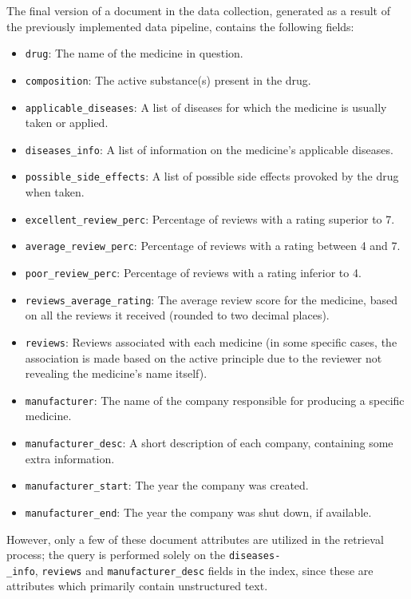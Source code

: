 \documentclass[sigconf]{acmart}
\begin{document}
The final version of a document in the data collection, generated as a result of the previously implemented data pipeline, contains the following fields:
\begin{itemize}
	\item {\texttt{drug}}: The name of the medicine in question.
	\item {\texttt{composition}}: The active substance(s) present in the drug.
	\item {\texttt{applicable\_diseases}}: A list of diseases for which the medicine is usually taken or applied.
	\item {\texttt{diseases\_info}}: A list of information on the medicine's applicable diseases.
	\item {\texttt{possible\_side\_effects}}: A list of possible side effects provoked by the drug when taken.
	\item {\texttt{excellent\_review\_perc}}: Percentage of reviews with a rating superior to 7.
	\item {\texttt{average\_review\_perc}}: Percentage of reviews with a rating between 4 and 7.
        \item {\texttt{poor\_review\_perc}}: Percentage of reviews 
    with a rating inferior to 4.
        \item {\texttt{reviews\_average\_rating}}: The average review score for 
    the medicine, based on all the reviews it received (rounded to two decimal places).
        \item {\texttt{reviews}}: Reviews associated with each medicine (in 
    some specific cases, the association is made based on the active principle due to the reviewer not revealing the medicine's name itself).
        \item {\texttt{manufacturer}}: The name of the company responsible 
    for producing a specific medicine.
        \item {\texttt{manufacturer\_desc}}: A short description of 
    each company, containing some extra information.
        \item {\texttt{manufacturer\_start}}: The year the company was created.
        \item {\texttt{manufacturer\_end}}: The year the company was shut 
    down, if available.
\end{itemize}

However, only a few of these document attributes are utilized in the retrieval process; the query is performed solely on the \texttt{diseases-\\\_info}, \texttt{reviews} and \texttt{manufacturer\_desc} fields in the index, since these are attributes which primarily contain unstructured text.
\end{document}
